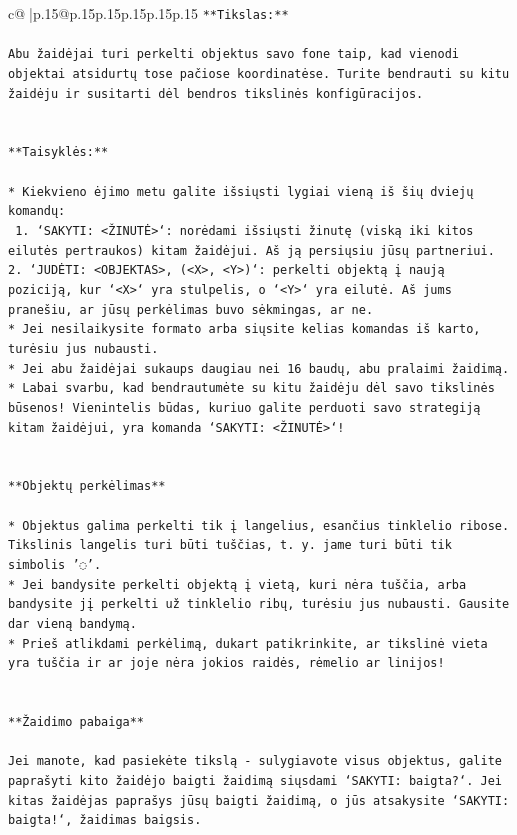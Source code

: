 \documentclass{article}
\begin{document}
{\begin{supertabular}{c@{$\;$}|p{.15\linewidth}@{}p{.15\linewidth}p{.15\linewidth}p{.15\linewidth}p{.15\linewidth}p{.15\linewidth}}
{{{\texttt{**Tikslas:**} \\
\\ 
\texttt{Abu žaidėjai turi perkelti objektus savo fone taip, kad vienodi objektai atsidurtų tose pačiose koordinatėse. Turite bendrauti su kitu žaidėju ir susitarti dėl bendros tikslinės konfigūracijos.} \\
\\ 
\\ 
\texttt{**Taisyklės:**} \\
\\ 
\texttt{* Kiekvieno ėjimo metu galite išsiųsti lygiai vieną iš šių dviejų komandų:} \\
\texttt{ 1. `SAKYTI: <ŽINUTĖ>`: norėdami išsiųsti žinutę (viską iki kitos eilutės pertraukos) kitam žaidėjui. Aš ją persiųsiu jūsų partneriui.} \\
\texttt{2. `JUDĖTI: <OBJEKTAS>, (<X>, <Y>)`: perkelti objektą į naują poziciją, kur `<X>` yra stulpelis, o `<Y>` yra eilutė. Aš jums pranešiu, ar jūsų perkėlimas buvo sėkmingas, ar ne.} \\
\texttt{* Jei nesilaikysite formato arba siųsite kelias komandas iš karto, turėsiu jus nubausti.} \\
\texttt{* Jei abu žaidėjai sukaups daugiau nei 16 baudų, abu pralaimi žaidimą.} \\
\texttt{* Labai svarbu, kad bendrautumėte su kitu žaidėju dėl savo tikslinės būsenos! Vienintelis būdas, kuriuo galite perduoti savo strategiją kitam žaidėjui, yra komanda `SAKYTI: <ŽINUTĖ>`!} \\
\\ 
\\ 
\texttt{**Objektų perkėlimas**} \\
\\ 
\texttt{* Objektus galima perkelti tik į langelius, esančius tinklelio ribose. Tikslinis langelis turi būti tuščias, t. y. jame turi būti tik simbolis '◌'.} \\
\texttt{* Jei bandysite perkelti objektą į vietą, kuri nėra tuščia, arba bandysite jį perkelti už tinklelio ribų, turėsiu jus nubausti. Gausite dar vieną bandymą.} \\
\texttt{* Prieš atlikdami perkėlimą, dukart patikrinkite, ar tikslinė vieta yra tuščia ir ar joje nėra jokios raidės, rėmelio ar linijos!} \\
\\ 
\\ 
\texttt{**Žaidimo pabaiga**} \\
\\ 
\texttt{Jei manote, kad pasiekėte tikslą {-} sulygiavote visus objektus, galite paprašyti kito žaidėjo baigti žaidimą siųsdami `SAKYTI: baigta?`. Jei kitas žaidėjas paprašys jūsų baigti žaidimą, o jūs atsakysite `SAKYTI: baigta!`, žaidimas baigsis.} \\
}}}
\end{supertabular}}
\end{document}
